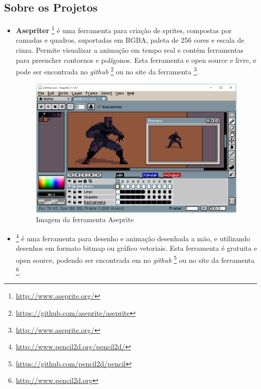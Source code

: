 \subsection{Sobre os Projetos}

\begin{itemize}
    \item \textbf{Asepriter}
\footnote{\url{http://www.aseprite.org/}} é uma ferramenta para criação de sprites,
 compostas por camadas e quadros, suportadas em RGBA, paleta de 256 cores e escala de cinza.
 Permite visualizar a animação em tempo real e contém ferramentas para preencher contornos
 e polígonos. Esta ferramenta e open source e livre, e pode ser encontrada no \textit{github}
\footnote{\url{https://github.com/aseprite/aseprite}} ou no site da ferramenta
\footnote{\url{http://www.aseprite.org/}}.

    \begin{figure}[h]
        \centering
            \includegraphics[scale=0.3]{figuras/aseprite.eps}
        \caption{Imagem da ferramenta Aseprite}
        \label{ferramenta_aseprite}
    \end{figure}

    \item \textbf{}
\footnote{\url{http://www.pencil2d.org/pencil2d/}} é uma ferramenta para
 desenho e animação desenhada a mão, e utilizando desenhos em formato bitmap ou gráfico vetoriais. 
Esta ferramenta é gratuita  e open source, podendo ser encontrada em no \textit{github}
\footnote{\url{https://github.com/pencil2d/pencil}} ou no site da ferramenta
\footnote{\url{http://www.pencil2d.org}}.


\end{itemize}
